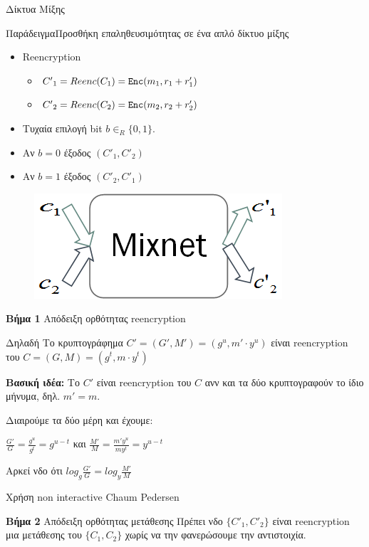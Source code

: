 \documentclass[handout]{beamer}
\begin{document}
\begin{section}{Δίκτυα Μίξης}
\begin{frame}[allowframebreaks]{Παράδειγμα}{Προσθήκη επαληθευσιμότητας σε ένα απλό δίκτυο μίξης}
\begin{multicols}{2}
\begin{itemize}
        \item Reencryption
          \begin{itemize}
        \item ${C'}_1 = Reenc(C_1)=\mathtt{Enc}(m_1,r_1+r_1')$ \item ${C'}_2 = Reenc(C_2)=\mathtt{Enc}(m_2,r_2+r_2')$
           \end{itemize}
        \item Tυχαία επιλογή bit $b \in_R \{0,1\}$.
        \item Αν $b=0$ έξοδος $({C'}_1, {C'}_2)$ 
        \item Αν $b=1$ έξοδος $({C'}_2, {C'}_1)$
    \end{itemize}
    \vfill \columnbreak
    \begin{figure}
        \includegraphics[scale=0.5]{mix2x2.PNG}
    \end{figure}
\end{multicols}

\framebreak
 
\textbf{Βήμα 1} Απόδειξη ορθότητας reencryption 

\begin{block}{Δηλαδή}
Το κρυπτογράφημα ${C'} = (G',M') = (g^u,m' \cdot y^u)$ είναι reencryption του $C = (G,M) = (g^t,m \cdot y^t)$
\end{block}

\textbf{Βασική ιδέα:} Το ${C'}$ είναι reencryption του $C$ ανν και τα δύο κρυπτογραφούν το ίδιο μήνυμα, δηλ. $m'=m$.

Διαιρούμε τα δύο μέρη και έχουμε:
\begin{center}
$\frac{G'}{G}=\frac{g^u}{g^t}=g^{u-t}$ και 
$\frac{M'}{M}=\frac{m' y^u}{m y^t}=y^{u-t}$ 
\end{center}

Αρκεί νδο ότι $ log_g \frac{G'}{G} = log_y \frac{M'}{M}$

Χρήση non interactive Chaum Pedersen

\framebreak

\begin{block}{\textbf{Βήμα 2} Απόδειξη ορθότητας μετάθεσης }
Πρέπει νδο $\{C'_1,C'_2\}$ είναι reencryption μια μετάθεσης του $\{C_1,C_2\}$ χωρίς να την φανερώσουμε την αντιστοιχία. \\
\end{block}
 


\end{frame}
\end{section}
\end{document}
